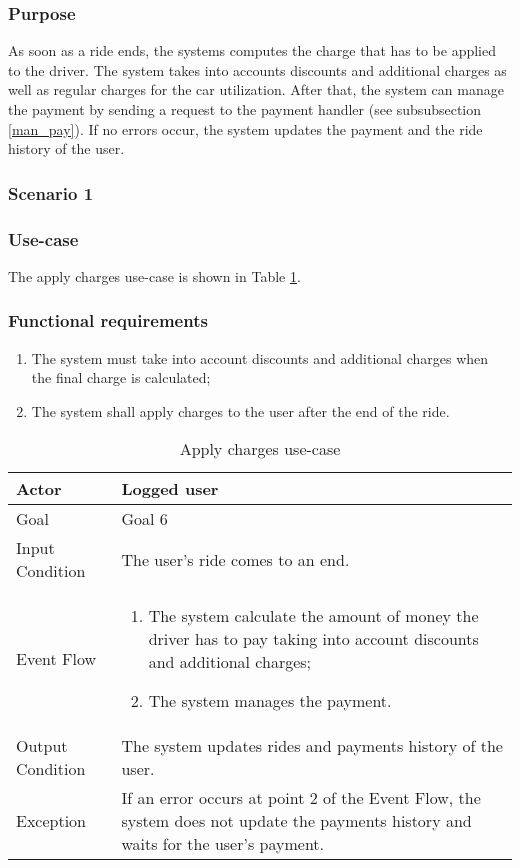 \subsubsection{Purpose}
As soon as a ride ends, the systems computes the charge that has to be applied to the driver. The system takes into accounts discounts and additional charges as well as regular charges for the car utilization. After that, the system can manage the payment by sending a request to the payment handler (see subsubsection \ref{man_pay}). If no errors occur, the system updates the payment and the ride history of the user.

\subsubsection{Scenario 1}

\subsubsection{Use-case}
The apply charges use-case is shown in Table \ref{apply_charges_uc}.

\subsubsection{Functional requirements}
\begin{enumerate}
\item The system must take into account discounts and additional charges when the final charge is calculated;
\item The system shall apply charges to the user after the end of the ride.
\end{enumerate}

\begin{table}[H]
\begin{center}
\begin{tabular}{p{} | p{}}
\hline
Actor & Logged user\\
\hline
Goal & Goal 6\\
\hline
Input Condition & The user's ride comes to an end.\\
\hline
Event Flow & 
\begin{enumerate}
\item The system calculate the amount of money the driver has to pay taking into account discounts and additional charges;
\item The system manages the payment.
\end{enumerate} \\
\hline
Output Condition & The system updates rides and payments history of the user.\\
\hline
Exception & If an error occurs at point 2 of the Event Flow, the system does not update the payments history and waits for the user's payment.\\
\hline
\end{tabular}
\end{center}
\caption{Apply charges use-case}
\label{apply_charges_uc}
\end{table}